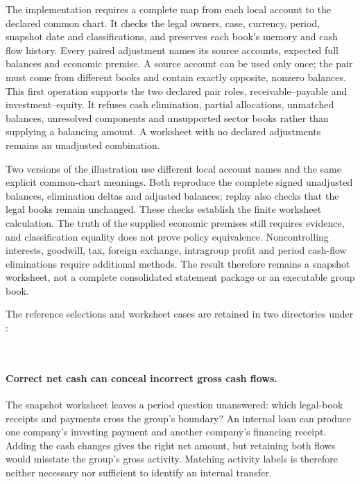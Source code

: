 The implementation requires a complete map from each local account to the
declared common chart. It checks the legal owners, case, currency, period,
snapshot date and classifications, and preserves each book's memory and cash
flow history. Every paired adjustment names its source accounts, expected
full balances and economic premise. A source account can be used only once;
the pair must come from different books and contain exactly opposite,
nonzero balances. This first operation supports the two declared pair roles,
receivable--payable and investment--equity. It refuses cash elimination,
partial allocations, unmatched balances, unresolved components and unsupported
sector books rather than supplying a balancing amount. A worksheet with no
declared adjustments remains an unadjusted combination.

Two versions of the illustration use different local account names and the
same explicit common-chart meanings. Both reproduce the complete signed
unadjusted balances, elimination deltas and adjusted balances; replay also
checks that the legal books remain unchanged. These checks establish the
finite worksheet calculation. The truth of the supplied economic premises
still requires evidence, and classification equality does not prove policy
equivalence. Noncontrolling interests, goodwill, tax, foreign exchange,
intragroup profit and period cash-flow eliminations require additional methods.
The result therefore remains a snapshot worksheet, not a complete consolidated
statement package or an executable group book.

The reference selections and worksheet cases are retained in two directories
under :
\begin{flushleft}\small
{}\\
\end{flushleft}



\newpage
\paragraph{Correct net cash can conceal incorrect gross cash flows.}
The snapshot worksheet leaves a period question unanswered: which legal-book
receipts and payments cross the group's boundary? An internal loan can produce
one company's investing payment and another company's financing receipt.
Adding the cash changes gives the right net amount, but retaining both flows
would misstate the group's gross activity. Matching activity labels is therefore
neither necessary nor sufficient to identify an internal transfer.

